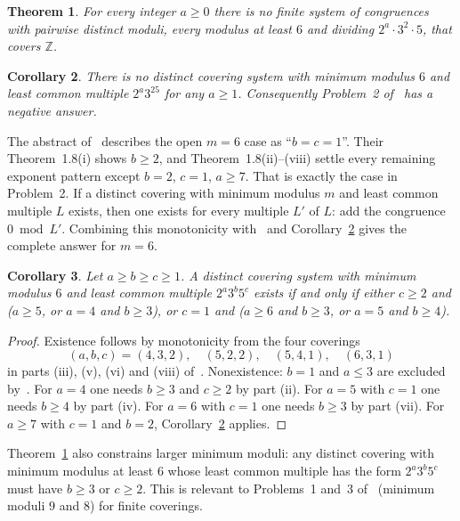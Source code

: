 \documentclass[11pt]{amsart}
\newtheorem{theorem}{Theorem}[section]
\newtheorem{corollary}[theorem]{Corollary}
\theoremstyle{definition}
\theoremstyle{remark}
\newcommand{\Z}{\mathbb Z}
\begin{document}
\begin{theorem}\label{thm:main}
For every integer $a\ge 0$ there is no finite system of congruences with pairwise distinct moduli, every modulus at least $6$ and dividing $2^a\cdot 3^2\cdot 5$, that covers $\Z$.
\end{theorem}

\begin{corollary}\label{cor:class}
There is no distinct covering system with minimum modulus $6$ and least common multiple $2^a3^25$ for any $a\ge1$. Consequently Problem~2 of~\cite{HKLT2026} has a negative answer.
\end{corollary}

The abstract of~\cite{HKLT2026} describes the open $m=6$ case as ``$b=c=1$''. Their Theorem~1.8(i) shows $b\ge2$, and Theorem~1.8(ii)--(viii) settle every remaining exponent pattern except $b=2$, $c=1$, $a\ge7$. That is exactly the case in Problem~2. If a distinct covering with minimum modulus $m$ and least common multiple $L$ exists, then one exists for every multiple $L'$ of $L$: add the congruence $0\bmod L'$. Combining this monotonicity with~\cite[Theorem~1.8]{HKLT2026} and Corollary~\ref{cor:class} gives the complete answer for $m=6$.

\begin{corollary}\label{cor:m6}
Let $a\ge b\ge c\ge1$. A distinct covering system with minimum modulus $6$ and least common multiple $2^a3^b5^c$ exists if and only if either $c\ge2$ and ($a\ge5$, or $a=4$ and $b\ge3$), or $c=1$ and ($a\ge6$ and $b\ge3$, or $a=5$ and $b\ge4$).
\end{corollary}

\begin{proof}
Existence follows by monotonicity from the four coverings
\[
(a,b,c)=(4,3,2),\quad (5,2,2),\quad (5,4,1),\quad (6,3,1)
\]
in parts (iii), (v), (vi) and (viii) of~\cite[Theorem~1.8]{HKLT2026}.
Nonexistence: $b=1$ and $a\le3$ are excluded by~\cite[Theorem~1.8(i)]{HKLT2026}. For $a=4$ one needs $b\ge3$ and $c\ge2$ by part (ii). For $a=5$ with $c=1$ one needs $b\ge4$ by part (iv). For $a=6$ with $c=1$ one needs $b\ge3$ by part (vii). For $a\ge7$ with $c=1$ and $b=2$, Corollary~\ref{cor:class} applies.
\end{proof}

Theorem~\ref{thm:main} also constrains larger minimum moduli: any distinct covering with minimum modulus at least $6$ whose least common multiple has the form $2^a3^b5^c$ must have $b\ge3$ or $c\ge2$. This is relevant to Problems~1 and~3 of~\cite{HKLT2026} (minimum moduli $9$ and $8$) for finite coverings.
\end{document}

